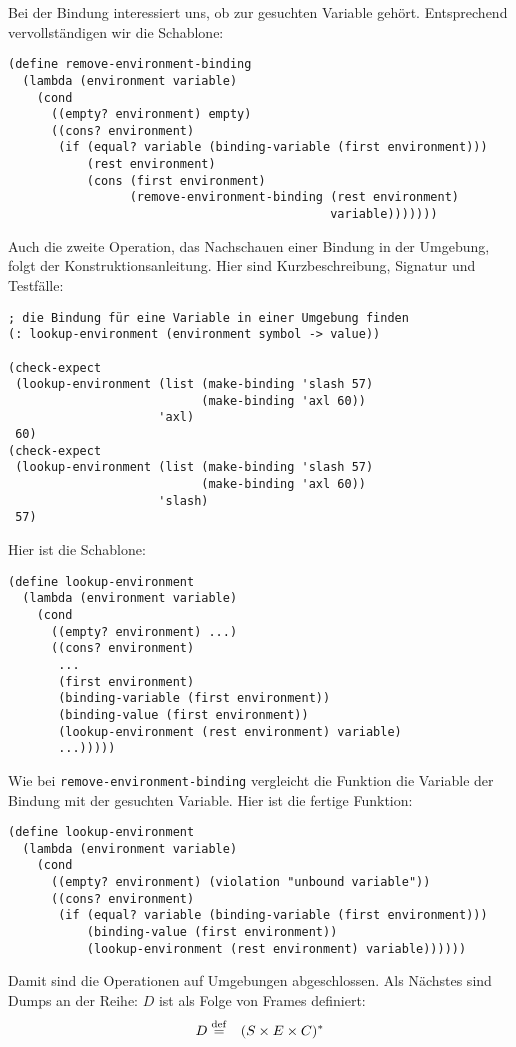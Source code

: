%
Bei der Bindung interessiert uns, ob zur gesuchten Variable gehört.
Entsprechend vervollständigen wir die Schablone:
%
\begin{lstlisting}
(define remove-environment-binding
  (lambda (environment variable)
    (cond
      ((empty? environment) empty)
      ((cons? environment)
       (if (equal? variable (binding-variable (first environment)))
           (rest environment)
           (cons (first environment)
                 (remove-environment-binding (rest environment)
                                             variable)))))))
\end{lstlisting} 
%
Auch die zweite Operation, das Nachschauen einer Bindung in der
Umgebung, folgt der Konstruktionsanleitung.  Hier sind
Kurzbeschreibung, Signatur und Testfälle:
%
\begin{lstlisting}
; die Bindung für eine Variable in einer Umgebung finden
(: lookup-environment (environment symbol -> value))

(check-expect
 (lookup-environment (list (make-binding 'slash 57)
                           (make-binding 'axl 60)) 
                     'axl)
 60)
(check-expect
 (lookup-environment (list (make-binding 'slash 57)
                           (make-binding 'axl 60))
                     'slash)
 57)
\end{lstlisting}
%
Hier ist die Schablone:
%
\begin{lstlisting}
(define lookup-environment
  (lambda (environment variable)
    (cond
      ((empty? environment) ...)
      ((cons? environment)
       ...
       (first environment)
       (binding-variable (first environment))
       (binding-value (first environment))
       (lookup-environment (rest environment) variable)
       ...)))))
\end{lstlisting}
%
Wie bei \lstinline{remove-environment-binding} vergleicht die Funktion
die Variable der Bindung mit der gesuchten Variable.  Hier ist die
fertige Funktion:
%
\begin{lstlisting}
(define lookup-environment
  (lambda (environment variable)
    (cond
      ((empty? environment) (violation "unbound variable"))
      ((cons? environment)
       (if (equal? variable (binding-variable (first environment)))
           (binding-value (first environment))
           (lookup-environment (rest environment) variable))))))
\end{lstlisting}
%
%
Damit sind die Operationen auf Umgebungen abgeschlossen.  Als Nächstes
sind Dumps an der Reihe: $D$ ist als Folge von Frames definiert:
%
\begin{eqnarray*}
  D &\stackrel{\rm def}{=}& (S\times E \times C)^\ast
\end{eqnarray*}
